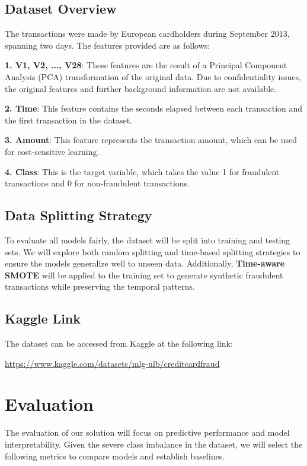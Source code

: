 \documentclass[11pt, oneside]{article}   	%
\begin{document}
\subsection{Dataset Overview}
The transactions were made by European cardholders during September 2013, spanning two days. The features provided are as follows:

\textbf{1. V1, V2, ..., V28}: These features are the result of a Principal Component Analysis (PCA) transformation of the original data. Due to confidentiality issues, the original features and further background information are not available.

\textbf{2. Time}: This feature contains the seconds elapsed between each transaction and the first transaction in the dataset.

\textbf{3. Amount}: This feature represents the transaction amount, which can be used for cost-sensitive learning.

\textbf{4. Class}: This is the target variable, which takes the value 1 for fraudulent transactions and 0 for non-fraudulent transactions.

\subsection{Data Splitting Strategy}
To evaluate all models fairly, the dataset will be split into training and testing sets. We will explore both random splitting and time-based splitting strategies to ensure the models generalize well to unseen data. Additionally, \textbf{Time-aware SMOTE} will be applied to the training set to generate synthetic fraudulent transactions while preserving the temporal patterns.

\subsection{Kaggle Link}

The dataset can be accessed from Kaggle at the following link:

\href{https://www.kaggle.com/datasets/mlg-ulb/creditcardfraud}{https://www.kaggle.com/datasets/mlg-ulb/creditcardfraud}


\section{Evaluation}

The evaluation of our solution will focus on predictive performance and model interpretability. Given the severe class imbalance in the dataset, we will select the following metrics to compare models and establish baselines.
\end{document}
